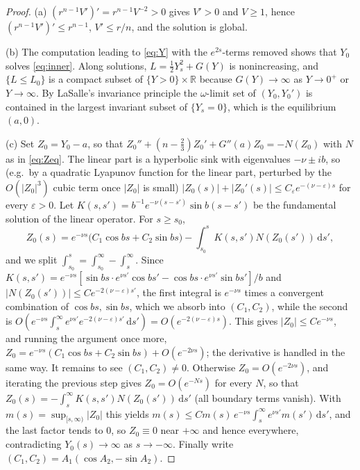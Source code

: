 \documentclass[11pt,a4paper]{amsart}
\theoremstyle{definition}
\theoremstyle{remark}
\newcommand{\R}{\mathbb{R}}
\newcommand{\eps}{\varepsilon}
\newcommand{\dd}{\,\mathrm{d}}
\begin{document}
\begin{proof}
(a) $(r^{n-1}V')'=r^{n-1}V^{-2}>0$ gives $V'>0$ and $V\ge1$, hence $(r^{n-1}V')'\le r^{n-1}$, $V'\le r/n$, and the solution is global.

(b) The computation leading to \eqref{eq:Y} with the $e^{2s}$-terms removed shows that $Y_0$ solves \eqref{eq:inner}.  Along solutions, $L=\frac12Y_s^2+G(Y)$ is nonincreasing, and $\{L\le L_0\}$ is a compact subset of $\{Y>0\}\times\R$ because $G(Y)\to\infty$ as $Y\to0^+$ or $Y\to\infty$.  By LaSalle's invariance principle the $\omega$-limit set of $(Y_0,Y_0')$ is contained in the largest invariant subset of $\{Y_s=0\}$, which is the equilibrium $(a,0)$.

(c) Set $Z_0=Y_0-a$, so that $Z_0''+(n-\frac23)Z_0'+G''(a)Z_0=-N(Z_0)$ with $N$ as in \eqref{eq:Zeq}.  The linear part is a hyperbolic sink with eigenvalues $-\nu\pm ib$, so (e.g.\ by a quadratic Lyapunov function for the linear part, perturbed by the $O(|Z_0|^3)$ cubic term once $|Z_0|$ is small) $|Z_0(s)|+|Z_0'(s)|\le C_\eps e^{-(\nu-\eps)s}$ for every $\eps>0$.  Let $K(s,s')=b^{-1}e^{-\nu(s-s')}\sin b(s-s')$ be the fundamental solution of the linear operator.  For $s\ge s_0$,
\[
Z_0(s)=e^{-\nu s}\big(C_1\cos bs+C_2\sin bs\big)-\int_{s_0}^{s}K(s,s')N(Z_0(s'))\dd s' ,
\]
and we split $\int_{s_0}^s=\int_{s_0}^\infty-\int_s^\infty$.  Since $K(s,s')=e^{-\nu s}[\sin bs\cdot e^{\nu s'}\cos bs'-\cos bs\cdot e^{\nu s'}\sin bs']/b$ and $|N(Z_0(s'))|\le Ce^{-2(\nu-\eps)s'}$, the first integral is $e^{-\nu s}$ times a convergent combination of $\cos bs,\sin bs$, which we absorb into $(C_1,C_2)$, while the second is $O(e^{-\nu s}\int_s^\infty e^{\nu s'}e^{-2(\nu-\eps)s'}\dd s')=O(e^{-2(\nu-\eps)s})$.  This gives $|Z_0|\le Ce^{-\nu s}$, and running the argument once more, $Z_0=e^{-\nu s}(C_1\cos bs+C_2\sin bs)+O(e^{-2\nu s})$; the derivative is handled in the same way.  It remains to see $(C_1,C_2)\ne0$.  Otherwise $Z_0=O(e^{-2\nu s})$, and iterating the previous step gives $Z_0=O(e^{-Ns})$ for every $N$, so that $Z_0(s)=-\int_s^\infty K(s,s')N(Z_0(s'))\dd s'$ (all boundary terms vanish).  With $m(s)=\sup_{[s,\infty)}|Z_0|$ this yields $m(s)\le Cm(s)\,e^{-\nu s}\int_s^\infty e^{\nu s'}m(s')\dd s'$, and the last factor tends to $0$, so $Z_0\equiv0$ near $+\infty$ and hence everywhere, contradicting $Y_0(s)\to\infty$ as $s\to-\infty$.  Finally write $(C_1,C_2)=A_1(\cos A_2,-\sin A_2)$.
\end{proof}
\end{document}

